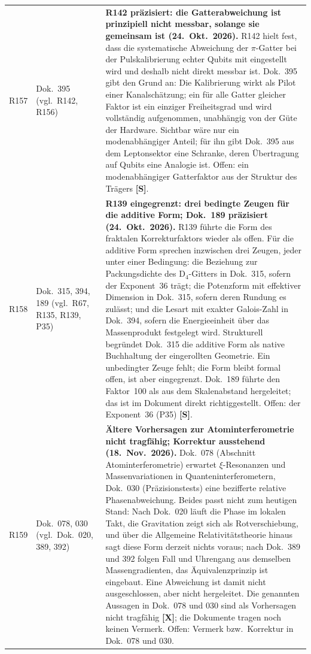 \begin{longtable}{@{}p{0.9cm}p{3.1cm}p{10.2cm}@{}}
R157 & Dok.~395 (vgl.\ R142, R156) & \textbf{R142 präzisiert: die Gatterabweichung ist prinzipiell nicht messbar, solange sie gemeinsam ist (24.~Okt.~2026).} R142 hielt fest, dass die systematische Abweichung der $\pi$-Gatter bei der Pulskalibrierung echter Qubits mit eingestellt wird und deshalb nicht direkt messbar ist. Dok.~395 gibt den Grund an: Die Kalibrierung wirkt als Pilot einer Kanalschätzung; ein für alle Gatter gleicher Faktor ist ein einziger Freiheitsgrad und wird vollständig aufgenommen, unabhängig von der Güte der Hardware. Sichtbar wäre nur ein modenabhängiger Anteil; für ihn gibt Dok.~395 aus dem Leptonsektor eine Schranke, deren Übertragung auf Qubits eine Analogie ist. Offen: ein modenabhängiger Gatterfaktor aus der Struktur des Trägers \textbf{[S]}. \\
R158 & Dok.~315, 394, 189 (vgl.\ R67, R135, R139, P35) & \textbf{R139 eingegrenzt: drei bedingte Zeugen für die additive Form; Dok.~189 präzisiert (24.~Okt.~2026).} R139 führte die Form des fraktalen Korrekturfaktors wieder als offen. Für die additive Form sprechen inzwischen drei Zeugen, jeder unter einer Bedingung: die Beziehung zur Packungsdichte des $\mathrm{D}_4$-Gitters in Dok.~315, sofern der Exponent~36 trägt; die Potenzform mit effektiver Dimension in Dok.~315, sofern deren Rundung es zulässt; und die Lesart mit exakter Galois-Zahl in Dok.~394, sofern die Energieeinheit über das Massenprodukt festgelegt wird. Strukturell begründet Dok.~315 die additive Form als native Buchhaltung der eingerollten Geometrie. Ein unbedingter Zeuge fehlt; die Form bleibt formal offen, ist aber eingegrenzt. Dok.~189 führte den Faktor~100 als aus dem Skalenabstand hergeleitet; das ist im Dokument direkt richtiggestellt. Offen: der Exponent~36 (P35) \textbf{[S]}. \\
R159 & Dok.~078, 030 (vgl.\ Dok.~020, 389, 392) & \textbf{Ältere Vorhersagen zur Atominterferometrie nicht tragfähig; Korrektur ausstehend (18.~Nov.~2026).} Dok.~078 (Abschnitt Atominterferometrie) erwartet $\xi$-Resonanzen und Massenvariationen in Quanteninterferometern, Dok.~030 (Präzisionstests) eine bezifferte relative Phasenabweichung. Beides passt nicht zum heutigen Stand: Nach Dok.~020 läuft die Phase im lokalen Takt, die Gravitation zeigt sich als Rotverschiebung, und über die Allgemeine Relativitätstheorie hinaus sagt diese Form derzeit nichts voraus; nach Dok.~389 und 392 folgen Fall und Uhrengang aus demselben Massengradienten, das Äquivalenzprinzip ist eingebaut. Eine Abweichung ist damit nicht ausgeschlossen, aber nicht hergeleitet. Die genannten Aussagen in Dok.~078 und 030 sind als Vorhersagen nicht tragfähig \textbf{[X]}; die Dokumente tragen noch keinen Vermerk. Offen: Vermerk bzw.\ Korrektur in Dok.~078 und 030. \\

\end{longtable}
